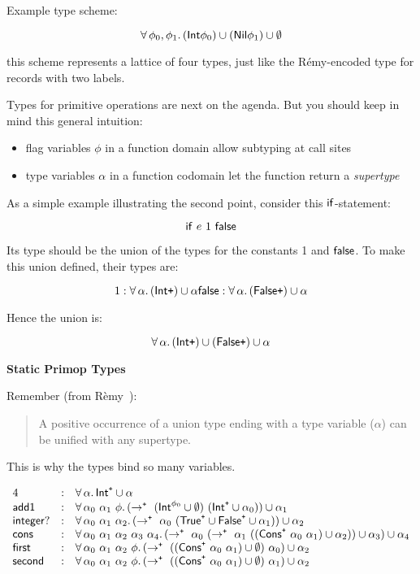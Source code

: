 \documentclass{article}
\begin{document}
Example type scheme:

$$ \forall\,\phi_0, \phi_1.\,(\mathsf{Int} \phi_0) \cup (\mathsf{Nil} \phi_1) \cup \emptyset $$

this scheme represents a lattice of four types, just like the R\'{e}my-encoded
 type for records with two labels.

Types for primitive operations are next on the agenda.
But you should keep in mind this general intuition:
\begin{itemize}
\item
  flag variables $\phi$ in a function domain allow subtyping at call sites
\item
  type variables $\alpha$ in a function codomain let the function return a \emph{supertype}
\end{itemize}

As a simple example illustrating the second point, consider this $\mathsf{if}$-statement:

$$ \mathsf{if}~e~1~\mathsf{false} $$

Its type should be the union of the types for the constants 1 and $\mathsf{false}$.
To make this union defined, their types are:

$$ 1 : \forall\,\alpha.\,(\mathsf{Int} \texttt{+}) \cup \alpha
   \\
   \mathsf{false} : \forall\,\alpha.\,(\mathsf{False} \texttt{+}) \cup \alpha$$

Hence the union is:

$$ \forall\,\alpha.\,(\mathsf{Int} \texttt{+}) \cup (\mathsf{False} \texttt{+}) \cup \alpha $$


\noindent \textbf{Static Primop Types}

Remember (from R\`{e}my~\cite{r-popl-1989}):
\begin{quote}
  A positive occurrence of a union type ending with a type variable ($\alpha$)
  can be unified with any supertype.
\end{quote}
This is why the types bind so many variables.


\[\begin{array}{l c l}
   4 & : & \forall\,\alpha.\,\mathsf{Int}^{\texttt{+}} \cup \alpha
\\ \mathsf{add1} & : & \forall\,\alpha_0~\alpha_1~\phi.\,(\rightarrow^{\texttt{+}}~(\mathsf{Int}^{\phi_0} \cup \emptyset)~(\mathsf{Int}^{\texttt{+}} \cup \alpha_0)) \cup \alpha_1
\\ \mathsf{integer?} & : & \forall\,\alpha_0~\alpha_1~\alpha_2.\,(\rightarrow^{\texttt{+}}~\alpha_0~(\mathsf{True}^{\texttt{+}} \cup \mathsf{False}^{\texttt{+}} \cup \alpha_1)) \cup \alpha_2
\\ \mathsf{cons} & : & \forall\,\alpha_0~\alpha_1~\alpha_2~\alpha_3~\alpha_4.\,(\rightarrow^{\texttt{+}}~\alpha_0~(\rightarrow^{\texttt{+}}~\alpha_1~((\mathsf{Cons}^{\texttt{+}}~\alpha_0~\alpha_1) \cup \alpha_2)) \cup \alpha_3) \cup \alpha_4
\\ \mathsf{first} & : & \forall\,\alpha_0~\alpha_1~\alpha_2~\phi.\,(\rightarrow^{\texttt{+}}~((\mathsf{Cons}^{\texttt{+}}~\alpha_0~\alpha_1) \cup \emptyset)~\alpha_0) \cup \alpha_2
\\ \mathsf{second} & : & \forall\,\alpha_0~\alpha_1~\alpha_2~\phi.\,(\rightarrow^{\texttt{+}}~((\mathsf{Cons}^{\texttt{+}}~\alpha_0~\alpha_1) \cup \emptyset)~\alpha_1) \cup \alpha_2
  \end{array}\]
\end{document}
